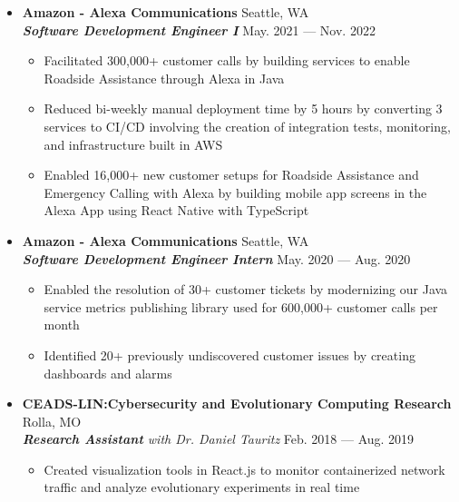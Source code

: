 \documentclass[9pt,oneside]{memoir}
\begin{document}
\begin{itemize}
      \item[] \textbf{Amazon - Alexa Communications}
            \hfill Seattle, WA\\
            \textit{\textbf{Software Development Engineer I}}
            \hfill May. 2021 --- Nov. 2022
            \begin{itemize}
                  \item[\textbullet] Facilitated 300,000+ customer calls by building services to enable Roadside Assistance through Alexa in Java
                  \item[\textbullet] Reduced bi-weekly manual deployment time by 5 hours by converting 3 services to CI/CD involving the creation of integration tests, monitoring, and infrastructure built in AWS 
                  \item[\textbullet] Enabled 16,000+ new customer setups for Roadside Assistance and Emergency Calling with Alexa by building mobile app screens in the Alexa App using React Native with TypeScript
            \end{itemize}
      
      \item[] \textbf{Amazon - Alexa Communications}
            \hfill Seattle, WA\\
            \textit{\textbf{Software Development Engineer Intern}}
            \hfill May. 2020 --- Aug. 2020
            \begin{itemize}
                  \item[\textbullet] Enabled the resolution of 30+ customer tickets by modernizing our Java service metrics publishing library used for 600,000+ customer calls per month
                  \item[\textbullet] Identified 20+ previously undiscovered customer issues by creating dashboards and alarms
            \end{itemize}

      \item[] \textbf{CEADS-LIN:\@ Cybersecurity and Evolutionary Computing Research}
            \hfill Rolla, MO\\
            \textit{\textbf{Research Assistant} with Dr. Daniel Tauritz}
            \hfill Feb. 2018 --- Aug. 2019
            \begin{itemize}
                  \item[\textbullet] Created visualization tools in React.js to
                        monitor containerized network traffic and analyze evolutionary experiments
                        in real time
            \end{itemize}


\end{itemize}
\end{document}
